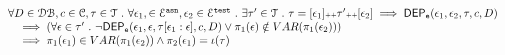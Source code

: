 \begin{lem}
\begin{itemize}
%
\[
\begin{array}{l}
	\forall D \in \dbdom , c \in \cdom, \trace \in \mathcal{T} \st \forall \event_1,\in \eventset^{\asn}, \event_2 \in \eventset^{\test} \st
	 \exists \trace' \in \mathcal{T} \st \trace = [\event_1] \tracecat \trace' \tracecat [\event_2]
	\implies
	\eventdep(\event_1, \event_2, \trace, c, D) 
	\\ \quad 
	\implies 
	\left( \forall \event \in \trace' \st 
	\neg \eventdep(\event_1, \event, \trace[\event_1:\event], c, D)
	\lor  \pi_1(\event) \notin VAR(\pi_1(\event_2))
	\right) 
	\\ \quad 
	\implies 
	\pi_1(\event_1) \in VAR(\pi_1(\event_2)) \land {\pi_2(\event_1)} = \llabel(\trace)
\end{array}
\]
\end{itemize}
\end{lem}
%
